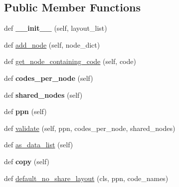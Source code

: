\subsection*{Public Member Functions}
\begin{DoxyCompactItemize}
\item 
\mbox{\label{classcodar_1_1cheetah_1_1model_1_1_node_layout_ae2945079ee29179931152b676bd2811d}} 
def {\bfseries \+\_\+\+\_\+init\+\_\+\+\_\+} (self, layout\+\_\+list)
\item 
def \hyperlink{classcodar_1_1cheetah_1_1model_1_1_node_layout_a60ed0982c3837eb355a4d6011e4f33ea}{add\+\_\+node} (self, node\+\_\+dict)
\item 
def \hyperlink{classcodar_1_1cheetah_1_1model_1_1_node_layout_a68224168f338df09ab150d5db29daa6b}{get\+\_\+node\+\_\+containing\+\_\+code} (self, code)
\item 
\mbox{\label{classcodar_1_1cheetah_1_1model_1_1_node_layout_a96d59b730f1373d3528e439d00e335ef}} 
def {\bfseries codes\+\_\+per\+\_\+node} (self)
\item 
\mbox{\label{classcodar_1_1cheetah_1_1model_1_1_node_layout_a790a390f6d7c0a1f49eeab9fdc4bc6dc}} 
def {\bfseries shared\+\_\+nodes} (self)
\item 
\mbox{\label{classcodar_1_1cheetah_1_1model_1_1_node_layout_a9892640e32e869d90c67206fdb3b4910}} 
def {\bfseries ppn} (self)
\item 
def \hyperlink{classcodar_1_1cheetah_1_1model_1_1_node_layout_a7571a9432cf5f4e35ae885ccc8f8db15}{validate} (self, ppn, codes\+\_\+per\+\_\+node, shared\+\_\+nodes)
\item 
def \hyperlink{classcodar_1_1cheetah_1_1model_1_1_node_layout_a7cba8a865e3556a1892b4b5ae5dd2f25}{as\+\_\+data\+\_\+list} (self)
\item 
\mbox{\label{classcodar_1_1cheetah_1_1model_1_1_node_layout_a93a22d0e1ec5e1a136842193299b38b3}} 
def {\bfseries copy} (self)
\item 
def \hyperlink{classcodar_1_1cheetah_1_1model_1_1_node_layout_a0273ea3cc0134d39e7a6017b593bc0a7}{default\+\_\+no\+\_\+share\+\_\+layout} (cls, ppn, code\+\_\+names)
\end{DoxyCompactItemize}
